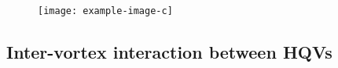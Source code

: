 \begin{figure}
    \centering
    \texttt{[image: example-image-c]}
    \label{fig:correlation-functions}
    \caption{}
\end{figure}
\subsection{Inter-vortex interaction between HQVs}
